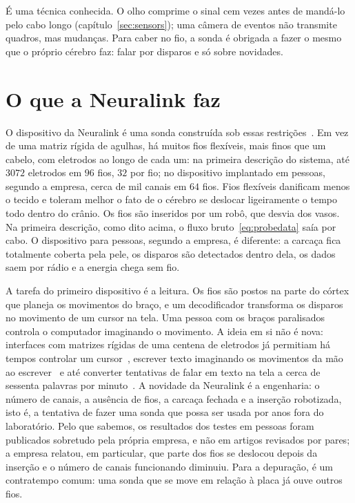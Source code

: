 É uma técnica conhecida. O olho comprime o sinal cem vezes antes de mandá-lo pelo cabo longo (capítulo~\ref{sec:sensors}); uma câmera de eventos não transmite quadros, mas mudanças. Para caber no fio, a sonda é obrigada a fazer o mesmo que o próprio cérebro faz: falar por disparos e só sobre novidades.

\section{O que a Neuralink faz}

O dispositivo da Neuralink é uma sonda construída sob essas restrições~\cite{Musk2019}. Em vez de uma matriz rígida de agulhas, há muitos fios flexíveis, mais finos que um cabelo, com eletrodos ao longo de cada um: na primeira descrição do sistema, até $3072$ eletrodos em $96$ fios, $32$ por fio; no dispositivo implantado em pessoas, segundo a empresa, cerca de mil canais em $64$ fios. Fios flexíveis danificam menos o tecido e toleram melhor o fato de o cérebro se deslocar ligeiramente o tempo todo dentro do crânio. Os fios são inseridos por um robô, que desvia dos vasos. Na primeira descrição, como dito acima, o fluxo bruto~\eqref{eq:probedata} saía por cabo. O dispositivo para pessoas, segundo a empresa, é diferente: a carcaça fica totalmente coberta pela pele, os disparos são detectados dentro dela, os dados saem por rádio e a energia chega sem fio.

A tarefa do primeiro dispositivo é a leitura. Os fios são postos na parte do córtex que planeja os movimentos do braço, e um decodificador transforma os disparos no movimento de um cursor na tela. Uma pessoa com os braços paralisados controla o computador imaginando o movimento. A ideia em si não é nova: interfaces com matrizes rígidas de uma centena de eletrodos já permitiam há tempos controlar um cursor~\cite{Hochberg2006}, escrever texto imaginando os movimentos da mão ao escrever~\cite{Willett2021} e até converter tentativas de falar em texto na tela a cerca de sessenta palavras por minuto~\cite{Willett2023}. A novidade da Neuralink é a engenharia: o número de canais, a ausência de fios, a carcaça fechada e a inserção robotizada, isto é, a tentativa de fazer uma sonda que possa ser usada por anos fora do laboratório. Pelo que sabemos, os resultados dos testes em pessoas foram publicados sobretudo pela própria empresa, e não em artigos revisados por pares; a empresa relatou, em particular, que parte dos fios se deslocou depois da inserção e o número de canais funcionando diminuiu. Para a depuração, é um contratempo comum: uma sonda que se move em relação à placa já ouve outros fios.

